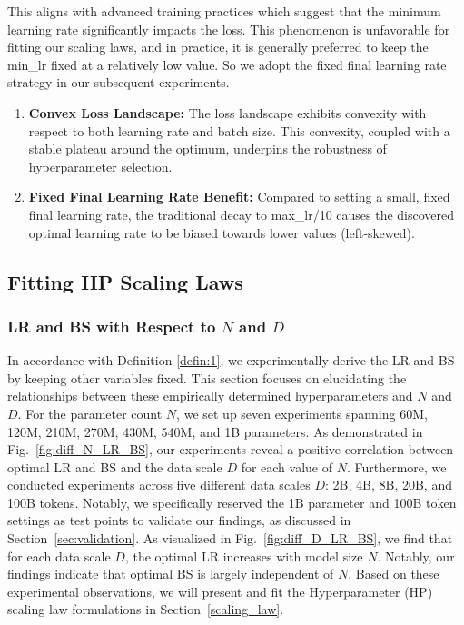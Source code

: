 \documentclass[11pt]{article}
\begin{document}
     This aligns with advanced training practices which suggest that the minimum learning rate significantly impacts the loss. This phenomenon is unfavorable for fitting our scaling laws, and in practice, it is generally preferred to keep the min\_lr fixed at a relatively low value. So we adopt the fixed final learning rate strategy in our subsequent experiments.

    \begin{tcolorbox}
        [callout={Key Takeaways}]
        \begin{enumerate}[\textbullet]
            \item \textbf{Convex Loss Landscape:} The loss landscape
                exhibits convexity with respect to both learning rate and batch size. This
                convexity, coupled with a stable plateau around the optimum,
                underpins the robustness of hyperparameter selection.

            \item \textbf{Fixed Final Learning Rate Benefit:} Compared to setting a small, fixed final learning rate, the traditional decay to  max\_lr/10 causes the discovered optimal learning rate to be biased towards lower values (left-skewed).
        \end{enumerate}
    \end{tcolorbox}

    \subsection{Fitting HP Scaling Laws}
    \label{fitting_hp_scaling_law}

    \subsubsection{LR and BS with Respect to $N$ and $D$}
    \label{LR_BS_wrt_N_D}

    In accordance with Definition \ref{defin:1}, we experimentally derive the LR and BS by keeping
    other variables fixed. This section focuses on elucidating the relationships between these empirically determined hyperparameters and $N$ and $D$. For the parameter count $N$, we set up seven experiments spanning 60M, 120M, 210M, 270M, 430M, 540M, and 1B parameters. As demonstrated in Fig.~\ref{fig:diff_N_LR_BS}, our experiments reveal a positive correlation between optimal LR and BS and the data scale $D$ for each value of $N$. Furthermore, we conducted experiments across five different data scales $D$: 2B, 4B, 8B, 20B, and 100B tokens. Notably, we specifically reserved the 1B parameter and 100B token settings as test points to validate our findings, as discussed in Section~\ref{sec:validation}.
    As visualized in Fig.~\ref{fig:diff_D_LR_BS}, we find that for each data scale
    $D$, the optimal LR increases with model size $N$. Notably, our findings
    indicate that optimal BS is largely independent of $N$. Based on these experimental
    observations, we will present and fit the Hyperparameter (HP) scaling law
    formulations in Section~\ref{scaling_law}.
\end{document}
